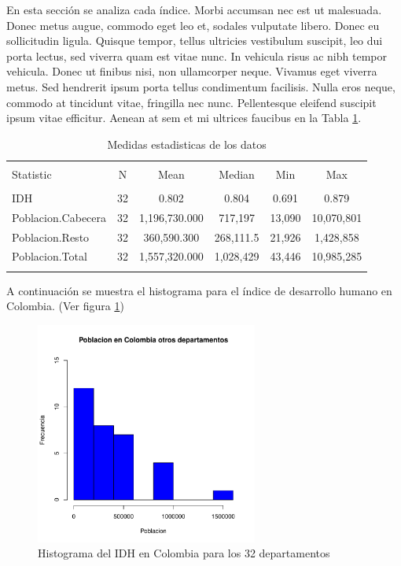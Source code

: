 En esta secci\'on se analiza cada \'indice. Morbi accumsan nec est ut malesuada. Donec metus augue, commodo eget leo et, sodales vulputate libero. Donec eu sollicitudin ligula. Quisque tempor, tellus ultricies vestibulum suscipit, leo dui porta lectus, sed viverra quam est vitae nunc. In vehicula risus ac nibh tempor vehicula. Donec ut finibus nisi, non ullamcorper neque. Vivamus eget viverra metus. Sed hendrerit ipsum porta tellus condimentum facilisis. Nulla eros neque, commodo at tincidunt vitae, fringilla nec nunc. Pellentesque eleifend suscipit ipsum vitae efficitur. Aenean at sem et mi ultrices faucibus en la Tabla \ref{stats}.

\begin{table}[!htbp] \centering 
  \caption{Medidas estadisticas de los datos} 
  \label{stats} 
\begin{tabular}{@{\extracolsep{2pt}}lccccc} 
\\[-1.8ex]\hline 
\hline \\[-1.8ex] 
Statistic & \multicolumn{1}{c}{N} & \multicolumn{1}{c}{Mean} & \multicolumn{1}{c}{Median} & \multicolumn{1}{c}{Min} & \multicolumn{1}{c}{Max} \\ 
\hline \\[-1.8ex] 
IDH & 32 & 0.802 & 0.804 & 0.691 & 0.879 \\ 
Poblacion.Cabecera & 32 & 1,196,730.000 & 717,197 & 13,090 & 10,070,801 \\ 
Poblacion.Resto & 32 & 360,590.300 & 268,111.5 & 21,926 & 1,428,858 \\ 
Poblacion.Total & 32 & 1,557,320.000 & 1,028,429 & 43,446 & 10,985,285 \\ 
\hline \\[-1.8ex] 
\end{tabular} 
\end{table} 

A continuaci\'on se muestra el histograma para el \'indice de desarrollo humano en Colombia. (Ver figura \ref{barplot1})

\begin{figure}[H]
\centering
\includegraphics[width=0.65\textwidth]{univariada-summaryDatos}
\caption{Histograma del IDH en Colombia para los 32 departamentos}
\label{barplot1}
\end{figure}

